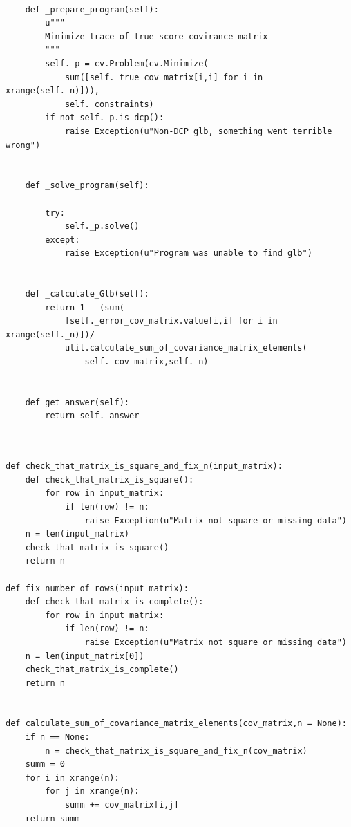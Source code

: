 \documentclass[a4paper,12pt,oneside]{article}
\newenvironment{customFloatWrap}{}{}
\numberwithin{equation}{section}
\theoremstyle{definition}
\begin{document}
\begin{subappendices}
\begin{customFloatWrap}
\begin{verbatim}
        
    def _prepare_program(self):
        u"""
        Minimize trace of true score covirance matrix
        """
        self._p = cv.Problem(cv.Minimize(
            sum([self._true_cov_matrix[i,i] for i in xrange(self._n)])),
            self._constraints)
        if not self._p.is_dcp():
            raise Exception(u"Non-DCP glb, something went terrible wrong")
            
            
    def _solve_program(self):

        try:
            self._p.solve()
        except:
            raise Exception(u"Program was unable to find glb")
        
    
    def _calculate_Glb(self):
        return 1 - (sum(
        	[self._error_cov_matrix.value[i,i] for i in xrange(self._n)])/
            util.calculate_sum_of_covariance_matrix_elements(
                self._cov_matrix,self._n)
        

    def get_answer(self):
        return self._answer
        
\end{verbatim}
\end{customFloatWrap}

\vspace{10pt}

\begin{customFloatWrap}
\begin{verbatim}

def check_that_matrix_is_square_and_fix_n(input_matrix):      
    def check_that_matrix_is_square():   
        for row in input_matrix:
            if len(row) != n:
                raise Exception(u"Matrix not square or missing data")  
    n = len(input_matrix) 
    check_that_matrix_is_square()
    return n

def fix_number_of_rows(input_matrix):
    def check_that_matrix_is_complete():   
        for row in input_matrix:
            if len(row) != n:
                raise Exception(u"Matrix not square or missing data")
    n = len(input_matrix[0])
    check_that_matrix_is_complete()
    return n
    

def calculate_sum_of_covariance_matrix_elements(cov_matrix,n = None):
    if n == None:
        n = check_that_matrix_is_square_and_fix_n(cov_matrix)
    summ = 0
    for i in xrange(n):
        for j in xrange(n):
            summ += cov_matrix[i,j]
    return summ


\end{verbatim}
\end{customFloatWrap}
\end{subappendices}
\end{document}
